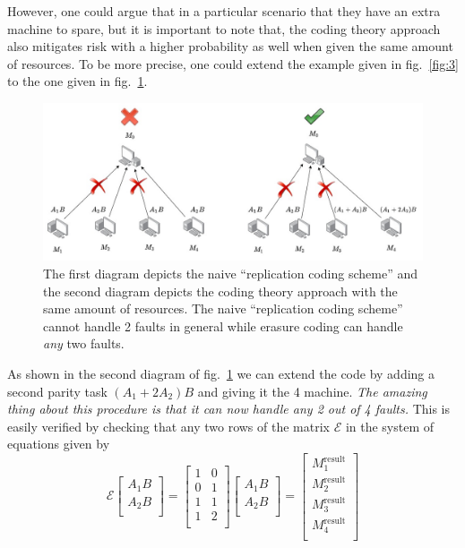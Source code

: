 \documentclass{report}
\begin{document}
However, one could argue that in a particular scenario that they have an extra machine to spare, but it is important to note that, the coding theory approach also mitigates risk with a higher probability as well when given the same amount of resources. To be more precise, one could extend the example given in fig.~\ref{fig:3} to the one given in fig.~\ref{fig:4}. 
\begin{figure}
    \centering
    \includegraphics[width=\textwidth]{strag_diag_3.jpg}
    \caption{
    The first diagram depicts the naive ``replication coding scheme'' and the second diagram depicts the coding theory approach with the same amount of resources. The naive ``replication coding scheme'' cannot handle 2 faults in general while erasure coding can handle \textit{any} two faults.
    }
    \label{fig:4}
\end{figure}
As shown in the second diagram of fig.~\ref{fig:4} we can extend the code by adding a second parity task $(A_1+2A_2)B$ and giving it the 4 machine. \textit{The amazing thing about this procedure is that it can now handle any 2 out of 4 faults.} This is easily verified by checking that any two rows of the matrix $\mathcal{E} $ in the system of equations given by
\begin{equation}\label{eq:firstcode}
    \mathcal{E} \begin{bmatrix}
       A_1 B\\ A_2B \\ 
    \end{bmatrix} =  \begin{bmatrix}
       1 & 0 \\
       0& 1\\ 
       1 &1 \\
       1 & 2\\
    \end{bmatrix} \begin{bmatrix}
       A_1 B\\ A_2B \\ 
    \end{bmatrix} =  \begin{bmatrix}
       M_1^\text{result}\\
       M_2^\text{result}\\ 
       M_3^\text{result} \\
       M_4^\text{result}\\
    \end{bmatrix} 
\end{equation}
\end{document}
